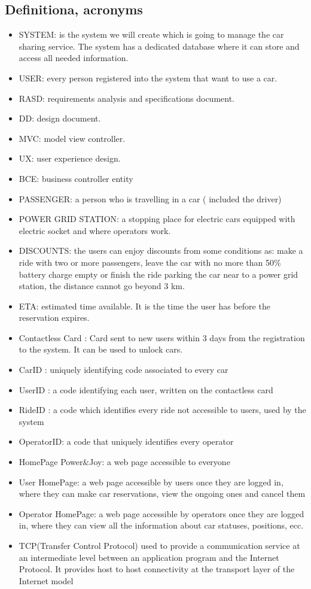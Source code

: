 \documentclass{article}
\begin{document}
\begin{flushleft}
\subsection{Definitiona, acronyms} %
\begin {itemize}
\item SYSTEM: is the system we will create which is going to manage the car sharing service. The system has a dedicated database where it can store and access all needed information.

\item USER: every person registered into the system that want to use a car.
\item RASD: requirements analysis and specifications document.

\item DD: design document.

\item MVC: model view controller.
\item UX:  user experience design.
\item BCE: business controller entity
\item PASSENGER:  a person who is travelling in a car ( included the driver)
\item POWER GRID STATION: a stopping place for electric cars equipped with electric socket and where operators work.
\item DISCOUNTS: the users can enjoy discounts from some conditions as: make a ride with two or more passengers, leave the car with no more than 50\% battery charge empty or finish the ride parking the car near to a power grid station, the distance cannot go beyond 3 km.
\item ETA:  estimated time available. It is the time the user has before the reservation expires.
\item Contactless Card : Card sent to new users within 3 days from the registration to the system. It can be used to unlock cars.
\item CarID : uniquely identifying code associated to every car
\item UserID : a code identifying each user, written on the contactless card
\item RideID : a code which identifies every ride not accessible to users, used by the system 
\item OperatorID: a code that uniquely identifies every operator
\item HomePage Power\&Joy: a web page accessible to everyone
\item User HomePage: a web page accessible by users once they are logged in, where they can make car reservations, view the ongoing ones and cancel them
\item Operator HomePage: a web page accessible by operators once they are logged in, where they can view all the information about car statuses,  positions, ecc.
\item TCP(Transfer Control Protocol)  used to provide a communication service at an intermediate level between an application program and the Internet Protocol. It provides  host to host connectivity at the transport layer of the Internet model



\end{itemize}
\end{flushleft}
\end{document}
